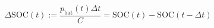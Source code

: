 \begin{equation}
\Delta \text{SOC}(t) := \frac{p_\text{bat}(t)\Delta t}{C} = \text{SOC}(t) - \text{SOC}(t-\Delta t)
\label{ch4:equ:change-soc}
\end{equation}
